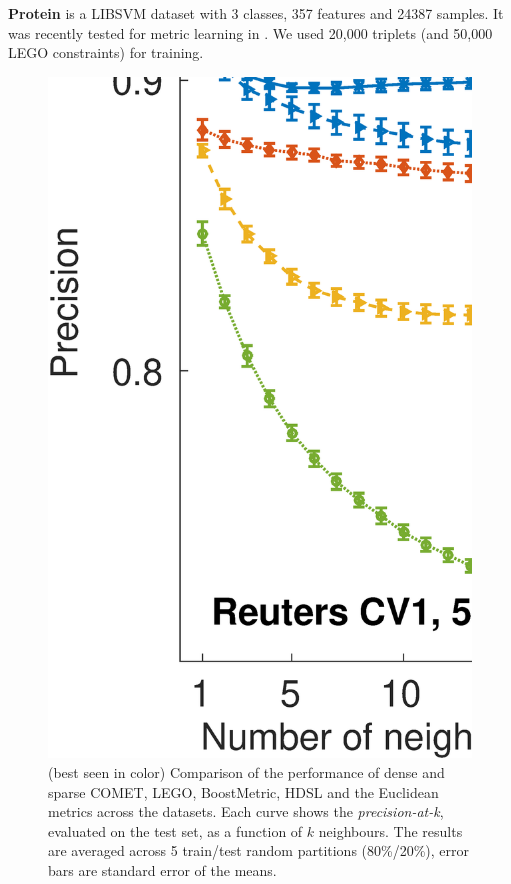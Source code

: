 \documentclass[twoside,11pt]{article}
\begin{document}
\textbf{Protein} is a LIBSVM \citep{libsvm} dataset with 3 classes, 357 features and 24387 samples. It was recently tested for metric learning in \citep{qian}. We used 20,000 triplets (and 50,000 LEGO constraints) for training.
\begin{figure}[ht]
\centering
\includegraphics[width=12cm]{Precision_at_K_all_datasets}
\captionsetup{font=small}
\caption{(best seen in color) Comparison of the performance of dense and sparse COMET, LEGO, BoostMetric, HDSL and the Euclidean metrics across the datasets. Each curve shows the \textit{precision-at-k}, evaluated on the test set, as a function of $k$ neighbours. The results are averaged across 5 train/test random partitions (80\%/20\%), error bars are standard error of the means.}\label{precFig}
\end{figure}
\end{document}
